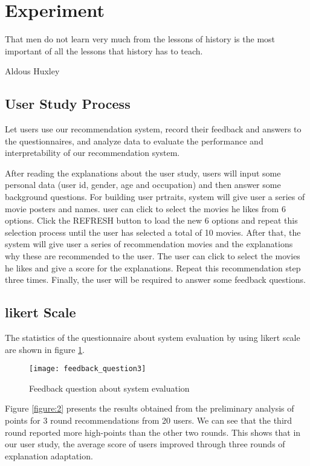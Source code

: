 
\section{Experiment}
\label{ch:experiment}

\epigraph{That men do not learn very much from the lessons of history is the most important of all the lessons that history has to teach.}{Aldous Huxley}

\subsection{User Study Process}
Let users use our recommendation system, record their feedback and answers to the questionnaires, and analyze data to evaluate the performance and interpretability of our recommendation system.
\par After reading the explanations about the user study, users will input some personal data (user id, gender, age and occupation) and then answer some background questions. For building user prtraits, system will give user a series of movie posters and names. user can click to select the movies he likes from 6 options. Click the REFRESH button to load the new 6 options and repeat this selection process until the user has selected a total of 10 movies. After that, the system will give user a series of recommendation movies and the explanations why these are recommended to the user. The user can click to select the movies he likes and give a score for the explanations. Repeat this recommendation step three times. Finally, the user will be required to answer some feedback questions.

\subsection{likert Scale}
The statistics of the questionnaire about system evaluation by using likert scale\cite{allen2007likert} are shown in figure \ref{figure:1}.

\begin{figure}[h]
\caption{Feedback question about system evaluation}
\label{figure:1}
\centering
\texttt{[image: feedback\_question3]}
\end{figure}

Figure \ref{figure:2} presents the results obtained from the preliminary analysis of points for 3 round recommendations from 20 users. We can see that the third round reported more high-points than the other two rounds. This shows that in our user study, the average score of users improved through three rounds of explanation adaptation.

